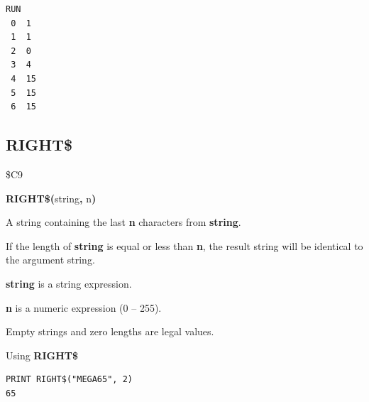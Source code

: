 \begin{description}[leftmargin=2cm,style=nextline]
\begin{tcolorbox}[colback=black,coltext=white]
\begin{verbatim}
RUN
 0  1
 1  1
 2  0
 3  4
 4  15
 5  15
 6  15
\end{verbatim}
\end{tcolorbox}
\end{description}


\newpage
\subsection{RIGHT\$}
\begin{description}[leftmargin=2cm,style=nextline]
\item [Token:]    \$C9

\item [Format:]   {\bf RIGHT\$(}string{\bf,} n{\bf)}

\item [Returns:]  A string containing the last {\bf n} characters from {\bf string}.

                  If the length of {\bf string} is equal or less than {\bf n}, the result string will be identical to the argument string.

                  {\bf string} is a string expression.

                  {\bf n} is a numeric expression (0 -- 255).

\item [Remarks:]  Empty strings and zero lengths are legal values.

\item [Example:]  Using {\bf RIGHT\$}

\begin{tcolorbox}[colback=black,coltext=white]
\verbatimfont{\codefont}
\begin{verbatim}
PRINT RIGHT$("MEGA65", 2)
65
\end{verbatim}
\end{tcolorbox}
\end{description}


\newpage
